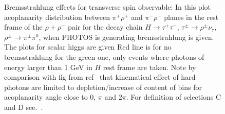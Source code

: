 \documentclass[]{Photos_interface_design}
\begin{document}
\begin{figure}[h!]
\centering
{}
\caption{Bremsstrahlung effects for transverse spin observable:
In this plot acoplanarity distribution between $\pi^+\rho^+$ and 
$\pi^-\rho^-$ planes in the rest frame of the $\rho+ \rho^-$ pair
for the decay
chain  $H\to \tau^+\tau^-$, $\tau^\pm \to \rho^\pm \nu_\tau$, 
$\rho^\pm \to \pi^\pm \pi^0$, when PHOTOS is generating bremsstrahlung is given.
The plots for scalar higgs are given
Red line is for no bremsstrahlung for the green one,
only events where photons of energy larger than 1 GeV in $H$ rest frame are taken.
Note by comparison with fig from ref~\cite{tauolaC++} that kinematical effect
of hard photons are limited to depletion/increase of content of bins for acoplanarity angle close to $0$, $\pi$ and $2\pi$. For definition of selections C and D see.~\cite{Bower:2002zx}. \label{fig:acoplanarity}
}
\end{figure}
\end{document}
